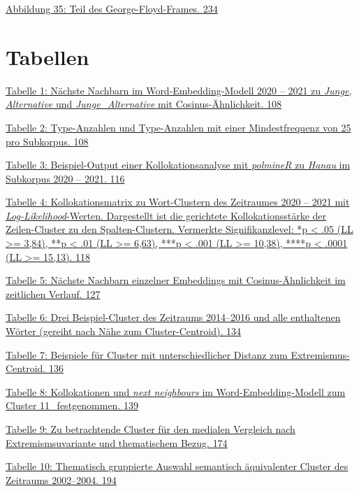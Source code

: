 \hyperref[_Ref162442563]{Abbildung 35: Teil des George-Floyd-Frames. \hyperref[_Ref162442563]{234}}

\section{Tabellen}\label{tabellen}

\hyperref[_Ref162017554]{Tabelle 1: Nächste Nachbarn im Word-Embedding-Modell 2020 -- 2021 zu \emph{Junge}, \emph{Alternative} und \emph{Junge\_Alternative} mit Cosinus-Ähnlichkeit. \hyperref[_Ref162017554]{108}}

\hyperref[_Ref162017306]{Tabelle 2: Type-Anzahlen und Type-Anzahlen mit einer Mindestfrequenz von 25 pro Subkorpus. \hyperref[_Ref162017306]{108}}

\hyperref[_Ref162017574]{Tabelle 3: Beispiel-Output einer Kollokationsanalyse mit \emph{polmineR} zu \emph{Hanau} im Subkorpus 2020 -- 2021. \hyperref[_Ref162017574]{116}}

\hyperref[_Ref162017334]{Tabelle 4: Kollokationsmatrix zu Wort-Clustern des Zeitraumes 2020 -- 2021 mit \emph{Log-Likelihood}-Werten. Dargestellt ist die gerichtete Kollokationsstärke der Zeilen-Cluster zu den Spalten-Clustern. Vermerkte Signifikanzlevel: *p \textless{} .05 (LL \textgreater= 3,84), **p \textless{} .01 (LL \textgreater= 6,63), ***p \textless{} .001 (LL \textgreater= 10,38), ****p \textless{} .0001 (LL \textgreater= 15,13). \hyperref[_Ref162017334]{118}}

\hyperref[_Ref162017640]{Tabelle 5: Nächste Nachbarn einzelner Embeddings mit Cosinus-Ähnlichkeit im zeitlichen Verlauf. \hyperref[_Ref162017640]{127}}

\hyperref[_Ref162017162]{Tabelle 6: Drei Beispiel-Cluster des Zeitraums 2014--2016 und alle enthaltenen Wörter (gereiht nach Nähe zum Cluster-Centroid). \hyperref[_Ref162017162]{134}}

\hyperref[_Ref162017170]{Tabelle 7: Beispiele für Cluster mit unterschiedlicher Distanz zum Extremismus-Centroid. \hyperref[_Ref162017170]{136}}

\hyperref[_Ref162017239]{Tabelle 8: Kollokationen und \emph{next neighbours} im Word-Embedding-Modell zum Cluster 11\_festgenommen. \hyperref[_Ref162017239]{139}}

\hyperref[_Ref162017380]{Tabelle 9: Zu betrachtende Cluster für den medialen Vergleich nach Extremismsuvariante und thematischem Bezug. \hyperref[_Ref162017380]{174}}

\hyperref[_Ref162017395]{Tabelle 10: Thematisch gruppierte Auswahl semantisch äquivalenter Cluster des Zeitraums 2002--2004. \hyperref[_Ref162017395]{194}}

